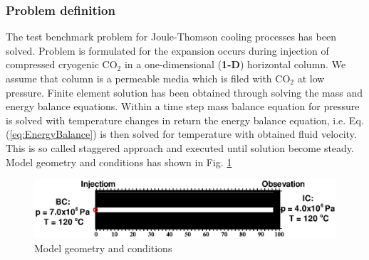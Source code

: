  
\subsubsection*{\upshape\textbf{Problem definition}}
The test benchmark problem for Joule-Thomson cooling processes has been solved. Problem is formulated for the expansion occurs during injection of compressed cryogenic $\mathrm {CO_2}$ in a one-dimensional (\textbf{1-D}) horizontal column. We assume that column is a permeable media which is filed with $\mathrm {CO_2}$ at low pressure. Finite element solution has been obtained through solving the mass and energy balance equations. Within a time step mass balance equation for pressure is solved with temperature changes in return the energy balance equation, i.e. Eq. (\ref{eq:EnergyBalance}) is then solved for temperature with obtained fluid velocity. This is so called staggered approach and executed until solution become steady. Model geometry and conditions has shown in Fig. \ref{fig:JTGeometry}\\
\begin{figure}[htb!]
\vspace{-0.25in}
\centering
\includegraphics[width=1.0\textwidth]{H_GAS/figures/JTCoolingGemetry.eps}
\vspace{-0.7in}
\caption{Model geometry and conditions}
\label{fig:JTGeometry}
\end{figure}
\vspace{-0.25in}
